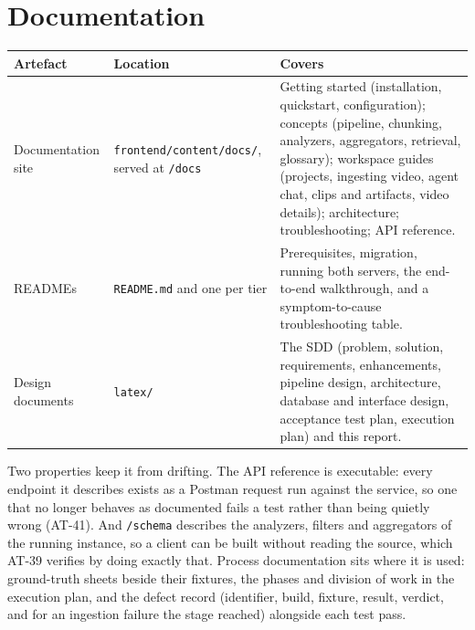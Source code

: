 \documentclass[11pt,a4paper]{article}
\begin{document}
\section{Documentation}

\begin{center}
\centering
\footnotesize
\begin{tabularx}{\textwidth}{@{}L{2.7cm}L{2.9cm}X@{}}
\toprule
\textbf{Artefact} & \textbf{Location} & \textbf{Covers} \\
\midrule
Documentation site & \texttt{frontend/}\allowbreak\texttt{content/docs/}, served at
\texttt{/docs} &
Getting started (installation, quickstart, configuration); concepts (pipeline, chunking,
analyzers, aggregators, retrieval, glossary); workspace guides (projects, ingesting video,
agent chat, clips and artifacts, video details); architecture; troubleshooting; API
reference. \\
READMEs & \texttt{README.md} and one per tier &
Prerequisites, migration, running both servers, the end-to-end walkthrough, and a
symptom-to-cause troubleshooting table. \\
Design documents & \texttt{latex/} &
The SDD (problem, solution, requirements, enhancements, pipeline design, architecture,
database and interface design, acceptance test plan, execution plan) and this report. \\
\bottomrule
\end{tabularx}
\end{center}

Two properties keep it from drifting. The API reference is executable: every endpoint it
describes exists as a Postman request run against the service, so one that no longer
behaves as documented fails a test rather than being quietly wrong (AT-41). And
\texttt{/schema} describes the analyzers, filters and aggregators of the running
instance, so a client can be built without reading the source, which AT-39 verifies by
doing exactly that. Process documentation sits where it is used: ground-truth sheets beside
their fixtures, the phases and division of work in the execution plan, and the defect
record (identifier, build, fixture, result, verdict, and for an ingestion failure the stage
reached) alongside each test pass.
\end{document}
